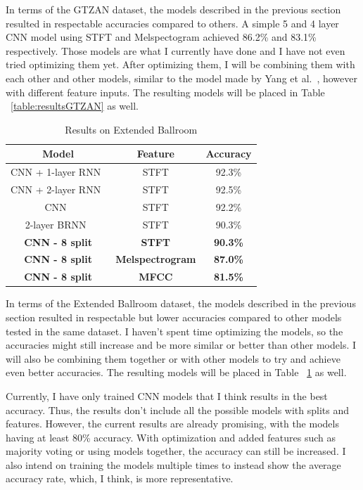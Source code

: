 \documentclass[10pt,twocolumn,letterpaper]{article}
\begin{document}
	In terms of the GTZAN dataset, the models described in the previous section resulted in respectable accuracies compared to others. A simple 5 and 4 layer CNN model using STFT and Melspectogram achieved 86.2\% and 83.1\% respectively. Those models are what I currently have done and I have not even tried optimizing them yet. After optimizing them, I will be combining them with each other and other models, similar to the model made by Yang et al.~\cite{yang2020parallel}, however with different feature inputs. The resulting models will be placed in Table ~\ref{table:resultsGTZAN} as well.
	
	\begin{table}[!htbp] %
		\caption{Results on Extended Ballroom}
		\centering
		\begin{tabular}[b]{ccc}
			\hline \hline
			Model & Feature & Accuracy 	\\ [0.5ex]
			\hline
			CNN + 1-layer RNN~\cite{yang2020parallel} & STFT & 92.3\%			\\
			CNN + 2-layer RNN~\cite{yang2020parallel} & STFT & 92.5\%			\\
			CNN~\cite{yang2020parallel} & STFT & 92.2\%							\\
			2-layer BRNN~\cite{schuster1997bidirectional} & STFT & 90.3\% 		\\
			\textbf{CNN - 8 split} & \textbf{STFT} & \textbf{90.3\%} 			\\
			\textbf{CNN - 8 split} & \textbf{Melspectrogram} & \textbf{87.0\%} 	\\
			\textbf{CNN - 8 split} & \textbf{MFCC} & \textbf{81.5\%} 			\\[1ex]
		\end{tabular}
	\label{table:resultsExtendedBallroom}
	\end{table}

	In terms of the Extended Ballroom dataset, the models described in the previous section resulted in respectable but lower accuracies compared to other models tested in the same dataset. I haven't spent time optimizing the models, so the accuracies might still increase and be more similar or better than other models. I will also be combining them together or with other models to try and achieve even better accuracies. The resulting models will be placed in Table ~\ref{table:resultsExtendedBallroom} as well.
	
	Currently, I have only trained CNN models that I think results in the best accuracy. Thus, the results don't include all the possible models with splits and features. However, the current results are already promising, with the models having at least 80\% accuracy. With optimization and added features such as majority voting or using models together, the accuracy can still be increased. I also intend on training the models multiple times to instead show the average accuracy rate, which, I think, is more representative. 
	
\end{document}
